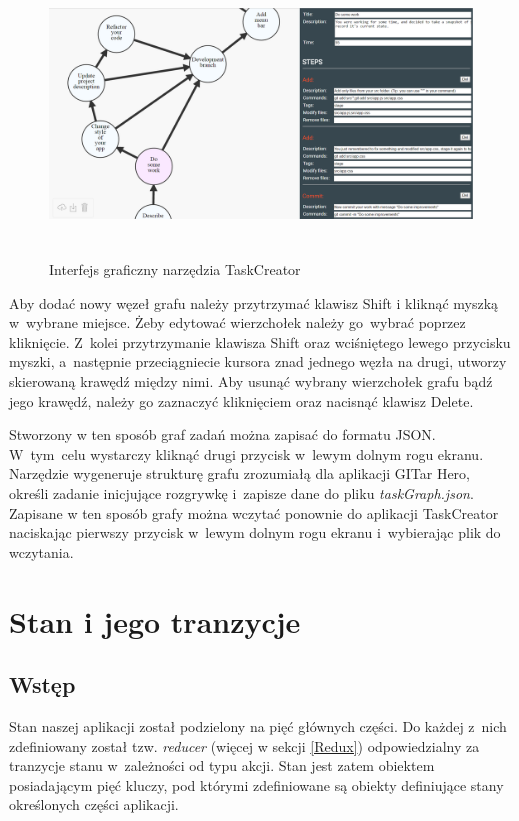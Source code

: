 \documentclass[12pt,a4paper,polish,thesis]{dcsbook}
\begin{document}
{	\begin{figure}[h]
		\centering
		\includegraphics[height=7.5cm]{taskCreator01}
		\caption{Interfejs graficzny narzędzia TaskCreator}
		\label{fig:taskCreator}
	\end{figure}

	Aby dodać nowy węzeł grafu należy przytrzymać klawisz Shift i kliknąć myszką w~wybrane miejsce. Żeby edytować wierzchołek należy go~wybrać poprzez kliknięcie. Z~kolei przytrzymanie klawisza Shift oraz wciśniętego lewego przycisku myszki, a~następnie przeciągniecie kursora znad jednego węzła na drugi, utworzy skierowaną krawędź między nimi. Aby usunąć wybrany wierzchołek grafu bądź jego krawędź, należy go zaznaczyć kliknięciem oraz nacisnąć klawisz Delete.

	Stworzony w ten sposób graf zadań można zapisać do formatu JSON. W~tym~celu wystarczy kliknąć drugi przycisk w~lewym dolnym rogu ekranu. Narzędzie wygeneruje strukturę grafu zrozumiałą dla aplikacji GITar Hero, określi zadanie inicjujące rozgrywkę i~zapisze dane do pliku \textit{taskGraph.json}. Zapisane w ten sposób grafy można wczytać ponownie do aplikacji TaskCreator naciskając pierwszy przycisk w~lewym dolnym rogu ekranu i~wybierając plik do wczytania.
	
	\section{Stan i jego tranzycje}
	
	\subsection{Wstęp}
	
	Stan naszej aplikacji został podzielony na pięć głównych części. Do każdej z~nich zdefiniowany został tzw. \textit{reducer} (więcej w sekcji \ref{Redux}) odpowiedzialny za tranzycje stanu w~zależności od typu akcji. Stan jest zatem obiektem posiadającym pięć kluczy, pod którymi zdefiniowane są obiekty definiujące stany określonych części aplikacji.
	
}
\end{document}
